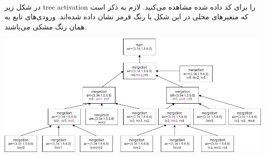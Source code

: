 
\\
در شکل زیر
tree activation
را برای کد داده شده مشاهده می‌کنید.
لازم به ذکر است که متغیرهای محلی
در این شکل با رنگ قرمز نشان داده شده‌اند.
ورودی‌های تابع به همان رنگ مشکی می‌باشند.
\graphicspath{{./images/}}
\begin{center}
	\includegraphics[scale=0.5]{images/q1.png}
\end{center}